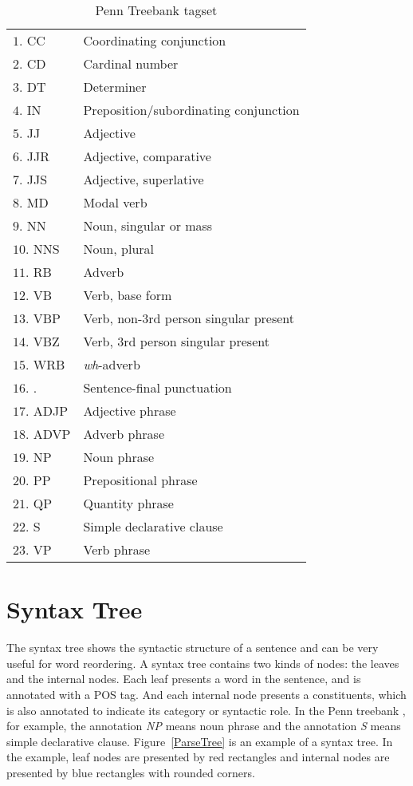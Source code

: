 \begin{table}
\centering
\begin{tabular}{|p{4.5cm}l|}
\hline
$1$. \hphantom{1}CC &  Coordinating conjunction\\
$2$.  \hphantom{1}CD &  Cardinal number\\
$3$. \hphantom{1}DT &  Determiner\\
$4$. \hphantom{1}IN &  Preposition/subordinating conjunction\\
$5$. \hphantom{1}JJ &  Adjective\\
$6$. \hphantom{1}JJR &   Adjective, comparative\\
$7$. \hphantom{1}JJS &   Adjective, superlative\\
$8$. \hphantom{1}MD &  Modal verb\\
$9$. \hphantom{1}NN &  Noun, singular or mass\\
$10$. NNS &   Noun, plural\\
$11$. RB &  Adverb\\
$12$. VB &  Verb, base form\\
$13$. VBP &   Verb, non-$3$rd person singular present\\
$14$. VBZ &   Verb, $3$rd person singular present\\
$15$. WRB &   \emph{wh}-adverb\\
$16$. . &   Sentence-final punctuation\\
$17$. ADJP &  Adjective phrase\\
$18$. ADVP &  Adverb phrase\\
$19$. NP &  Noun phrase\\
$20$. PP &  Prepositional phrase\\
$21$. QP &  Quantity phrase\\
$22$. S &  Simple declarative clause\\
$23$. VP &  Verb phrase \\ \hline
\end{tabular}
\caption{Penn Treebank tagset}
\label{ttags}
\end{table}
\label{ch:Foundations:sec:PosTag}

\section{Syntax Tree}
\label{ch:Foundations:sec:SyntacticTree}

The syntax tree shows the syntactic structure of a sentence and can be very useful for word reordering. A syntax tree contains two kinds of nodes: the leaves and the internal nodes. Each leaf presents a word in the sentence, and is annotated with a POS tag. And each internal node presents a constituents, which is also annotated to indicate its category or syntactic role. In the Penn treebank \citep{penn, penn3}, for example, the annotation \emph{NP} means noun phrase and the annotation \emph{S} means simple declarative clause. Figure~\ref{ParseTree} is an example of a syntax tree. In the example, leaf nodes are presented by red rectangles and internal nodes are presented by blue rectangles with rounded corners.

